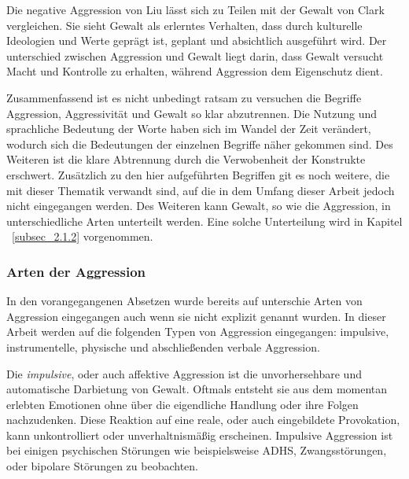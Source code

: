 Die negative Aggression von Liu lässt sich zu Teilen mit der Gewalt von Clark vergleichen. %
Sie sieht Gewalt als erlerntes Verhalten, dass durch kulturelle Ideologien und Werte geprägt 
ist,  geplant und absichtlich ausgeführt wird. Der unterschied zwischen Aggression und Gewalt
liegt darin, dass Gewalt versucht Macht und Kontrolle zu erhalten, während Aggression dem 
Eigenschutz dient. %

Zusammenfassend ist es nicht unbedingt ratsam zu versuchen die Begriffe Aggression, 
Aggressivität und Gewalt so klar abzutrennen. Die Nutzung und sprachliche Bedeutung der Worte
haben sich im Wandel der Zeit verändert, wodurch sich die Bedeutungen der einzelnen Begriffe 
näher gekommen sind. Des Weiteren ist die klare Abtrennung durch die Verwobenheit der Konstrukte
erschwert. Zusätzlich zu den hier aufgeführten Begriffen git es noch weitere, die mit dieser
Thematik verwandt sind, auf die in dem Umfang dieser Arbeit jedoch nicht eingegangen werden.
Des Weiteren kann Gewalt, so wie die Aggression, in unterschiedliche Arten unterteilt werden.
Eine solche Unterteilung wird in Kapitel ~\ref{subsec_2.1.2} vorgenommen.



\subsubsection{Arten der Aggression}    \label{subsubsec_2.1.3.1}
In den vorangegangenen Absetzen wurde bereits auf unterschie Arten von Aggression eingegangen
auch wenn sie nicht explizit genannt wurden. In dieser Arbeit werden auf die folgenden Typen
von Aggression eingegangen: impulsive, instrumentelle, physische und abschließenden verbale 
Aggression.

Die \textit{impulsive}, oder auch affektive Aggression ist die unvorhersehbare und automatische 
Darbietung von Gewalt. Oftmals entsteht sie aus dem momentan erlebten Emotionen ohne über die 
eigendliche Handlung oder ihre Folgen nachzudenken. Diese Reaktion auf eine reale, oder auch 
eingebildete Provokation, kann unkontrolliert oder unverhaltnismäßig erscheinen. %
Impulsive Aggression ist bei einigen psychischen Störungen wie beispielsweise ADHS, 
Zwangsstörungen, oder bipolare Störungen zu beobachten. %


